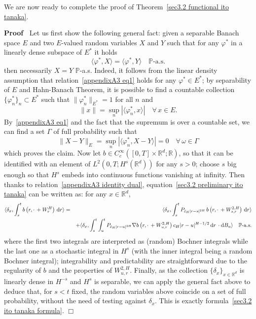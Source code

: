 \documentclass[10pt]{article}
\newcommand{\mathd}{\mathrm{d}}
\newcommand{\tmcolor}[2]{{\color{#1}{#2}}}
\newenvironment{proof}{\noindent\textbf{Proof\ }}{\hspace*{\fill}$\Box$\medskip}
\begin{document}
We are now ready to complete the proof of Theorem~\ref{sec3.2 functional ito
tanaka}.

\begin{proof}
  Let us first show the following general fact: given a separable Banach space
  $E$ and two $E$\mbox{-}valued random variables $X$ and $Y$ such that for any
  $\varphi^{\ast}$ in a linearly dense subspace of $E^{\ast}$ it holds
  \begin{equation}
    \langle \varphi^{\ast}, X \rangle = \langle \varphi^{\ast}, Y \rangle
    \quad \mathbb{P} \text{-a.s.} \label{appendixA3 eq1}
  \end{equation}
  then necessarily $X = Y$ $\mathbb{P}$-a.s. Indeed, it follows from the
  linear density assumption that relation~{\eqref{appendixA3 eq1}} holds for
  any $\varphi^{\ast} \in E^{\ast}$; by separability of $E$ and Hahn-Banach
  Theorem, it is possible to find a countable collection $\{ \varphi_n^{\ast}
  \}_n \subset E^{\ast}$ such that $\| \varphi^{\ast}_n \|_{E^{\ast}} = 1$ for
  all $n$ and
  \[ \| x \| = \sup_n | \langle \varphi^{\ast}_n, x \rangle | \quad \forall \,
     x \in E. \]
  By~{\eqref{appendixA3 eq1}} and the fact that the supremum is over a
  countable set, we can find a set $\Gamma$ of full probability such that
  \[ \| X - Y \|_E = \sup_n | \langle \varphi_n^{\ast}, X - Y \rangle | = 0
     \quad \forall \, \omega \in \Gamma \]
  which proves the claim. Now let $b \in C^{\infty}_c ([0, T] \times
  \mathbb{R}^d ; \mathbb{R})$, so that it can be identified with an element of
  $L^2 (0, T ; H^s (\mathbb{R}^d))$ for any $s > 0$; choose $s$ big enough so
  that $H^s$ embeds into continuous functions vanishing at infinity. Then
  thanks to relation~{\eqref{appendixA3 identity dual}},
  equation~{\eqref{sec3.2 preliminary ito tanaka}} can be written as: for any
  $x \in \mathbb{R}^d$,
  \begin{eqnarray*}
    \langle \delta_x, \int_s^t b \left( r, \cdot \, + W^H_r \right) \, \mathd
    r \rangle & = & \tmcolor{black}{\langle \delta_x, \int_s^t P_{\tilde{c}_H
    | r - s |^{2 H}} \, b \left( r, \cdot \, + W^{2, H}_{s, r} \right) \,
    \mathd r \rangle}\\
    &  & + \langle \delta_x, \int_s^t \int_u^t P_{\tilde{c}_H | r - u |^{2
    H}} \nabla b \left( r, \cdot \, + W^{2, H}_{u, r} \right) c_H | r - u |^{H
    - 1 / 2} \, \mathd r \, \cdot \mathd B_u \rangle \quad \mathbb{P}
    \text{-a.s.}
  \end{eqnarray*}
  where the first two integrals are interpreted as (random) Bochner integrals
  while the last one as a stochastic integral in $H^s$ (with the inner
  integral being a random Bochner integral); integrability and predictability
  are straightforward due to the regularity of $b$ and the properties of
  $W^{2, H}_{u, r}$. Finally, as the collection $\{ \delta_x \}_{x \in
  \mathbb{R}^d}$ is linearly dense in $H^{- s}$ and $H^s$ is separable, we can
  apply the general fact above to deduce that, for $s < t$ fixed, the random
  variables above coincide on a set of full probability, without the need of
  testing against $\delta_x$. This is exactly formula~{\eqref{sec3.2 ito
  tanaka formula}}.
\end{proof}
\end{document}

